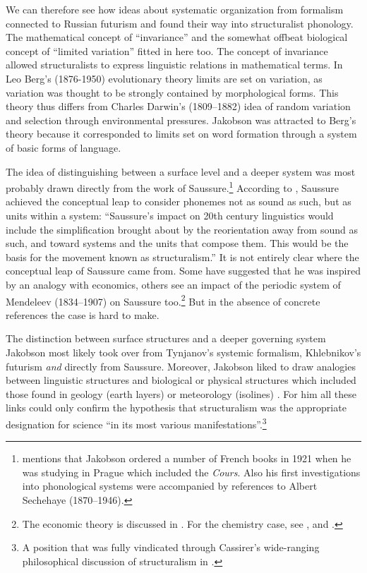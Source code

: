 \documentclass[output=paper]{langscibook}
\begin{document}
We can therefore see how ideas about systematic organization from formalism connected to Russian futurism and found their way into structuralist phonology. The mathematical concept of ``invariance'' and the somewhat offbeat biological concept of ``limited variation'' fitted in here too. The concept of invariance allowed structuralists to express linguistic relations in mathematical terms. In Leo Berg's (1876-1950) evolutionary theory limits are set on variation, as variation was thought to be strongly contained by morphological forms. This theory thus differs from Charles Darwin's (1809--1882) idea of random variation and selection through environmental pressures. Jakobson was attracted to Berg's theory because it corresponded to limits set on word formation through a system of basic forms of language.

The idea of distinguishing between a surface level and a deeper system was most probably drawn directly from the work of Saussure.\footnote{\citet[88--94]{Toman1995} mentions that Jakobson ordered a number of French books in 1921 when he was studying in Prague which included the \emph{Cours}. Also his first investigations into phonological systems were accompanied by references to Albert Sechehaye (1870--1946).} According to \citet[237]{Joseph2010}, Saussure achieved the conceptual leap to consider phonemes not as sound as such, but as units within a system: ``Saussure's impact on 20th century linguistics would include the simplification brought about by the reorientation away from sound as such, and toward systems and the units that compose them. This would be the basis for the movement known as structuralism.” It is not entirely clear where the conceptual leap of Saussure came from. Some have suggested that he was inspired by an analogy with economics, others see an impact of the periodic system of Mendeleev (1834--1907) on Saussure too.\footnote{The economic theory is discussed in \citet{Joseph2014}. For the chemistry case, see \citet{Culler1976}, \citet{Clark2008} and \citet{Silverstein2016}.} But in the absence of concrete references the case is hard to make. 

The distinction between surface structures and a deeper governing system Jakobson most likely took over from Tynjanov's systemic formalism, Khlebnikov's futurism \emph{and} directly from Saussure. Moreover, Jakobson liked to draw analogies between linguistic structures and biological or physical structures which included those found in geology (earth layers) or meteorology (isolines) \citep[see][74-74, 188--194]{Holenstein1975}. For him all these links could only confirm the hypothesis that structuralism was the appropriate designation for science ``in its most various manifestations''.\footnote{A position that was fully vindicated through Cassirer's wide-ranging philosophical discussion of structuralism in \citet{Cassirer1945}.}  
\end{document}
